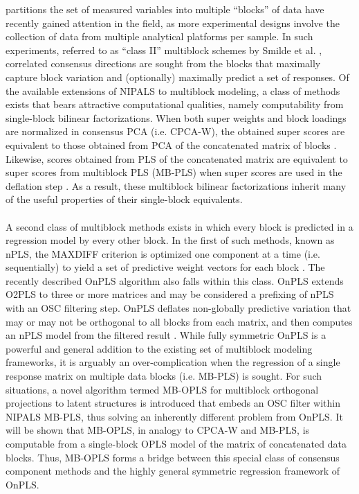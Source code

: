 \begin{doublespace}
partitions the set of measured variables into multiple ``blocks'' of data have
recently gained attention in the field, as more experimental designs involve
the collection of data from multiple analytical platforms per sample. In such
experiments, referred to as ``class II'' multiblock schemes by Smilde et al.
\cite{smilde:jchemo2003}, correlated consensus directions are sought from the
blocks that maximally capture block variation and (optionally) maximally
predict a set of responses. Of the available extensions of NIPALS to
multiblock modeling, a class of methods exists that bears attractive
computational qualities, namely computability from single-block bilinear
factorizations. When both super weights and block loadings are normalized in
consensus PCA (i.e. CPCA-W), the obtained super scores are equivalent to those
obtained from PCA of the concatenated matrix of blocks
\cite{westerhuis:jchemo1998}. Likewise, scores obtained from PLS of the
concatenated matrix are equivalent to super scores from multiblock PLS
(MB-PLS) when super scores are used in the deflation step
\cite{westerhuis:jchemo1997,westerhuis:jchemo1998}. As a result, these
multiblock bilinear factorizations inherit many of the useful properties
of their single-block equivalents.
\\\\
A second class of multiblock methods exists in which every block is predicted
in a regression model by every other block. In the first of such methods,
known as nPLS, the MAXDIFF criterion \cite{tenberge:psych1988} is optimized
one component at a time (i.e. sequentially) to yield a set of predictive
weight vectors for each block \cite{lofstedt:jchemo2011}. The recently
described OnPLS algorithm also falls within this class. OnPLS extends O2PLS
to three or more matrices and may be considered a prefixing of nPLS with an
OSC filtering step. OnPLS deflates non-globally predictive variation that
may or may not be orthogonal to all blocks from each matrix, and then computes
an nPLS model from the filtered result \cite{lofstedt:jchemo2011}. While fully
symmetric OnPLS is a powerful and general addition to the existing set of
multiblock modeling frameworks, it is arguably an over-complication when
the regression of a single response matrix on multiple data blocks
(i.e. MB-PLS) is sought. For such situations, a novel algorithm termed
MB-OPLS for multiblock orthogonal projections to latent structures is
introduced that embeds an OSC filter within NIPALS MB-PLS, thus solving an
inherently different problem from OnPLS. It will be shown that MB-OPLS, in
analogy to CPCA-W and MB-PLS, is computable from a single-block OPLS model
of the matrix of concatenated data blocks. Thus, MB-OPLS forms a bridge
between this special class of consensus component methods and the highly
general symmetric regression framework of OnPLS.
\end{doublespace}

